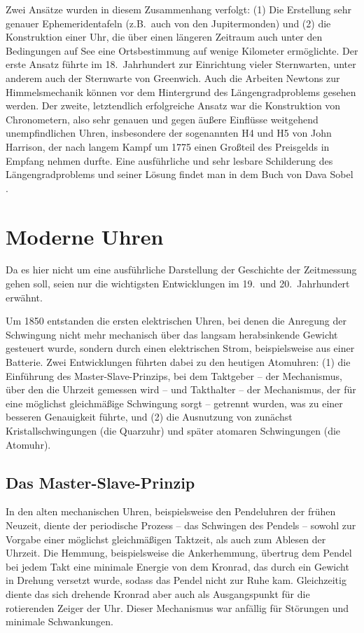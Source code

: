 Zwei Ans\"atze wurden in diesem Zusammenhang verfolgt: (1) Die Erstellung sehr genauer Ephemeridentafeln 
(z.B.\ auch von den Jupitermonden) und (2) die Konstruktion einer Uhr, die \"uber einen l\"angeren Zeitraum
auch unter den Bedingungen auf See eine Ortsbestimmung auf wenige Kilometer erm\"oglichte. Der erste
Ansatz f\"uhrte im 18.\ Jahrhundert zur Einrichtung vieler Sternwarten, unter anderem auch der
Sternwarte von Greenwich. Auch die Arbeiten Newtons zur Himmelsmechanik k\"onnen vor dem 
Hintergrund des L\"angengradproblems gesehen werden. Der zweite, letztendlich erfolgreiche Ansatz
war die Konstruktion von Chronometern, 
also sehr genauen und gegen \"au\ss ere Einfl\"usse weitgehend
unempfindlichen Uhren, insbesondere der sogenannten 
H4 und H5 von John Harrison, der nach langem Kampf
um 1775 einen Gro\ss teil des Preisgelds in Empfang nehmen durfte. Eine ausf\"uhrliche und sehr lesbare
Schilderung des L\"angengradproblems und seiner L\"osung findet man in dem Buch von Dava Sobel \cite{Sobel}.

\section{Moderne Uhren}

Da es hier nicht um eine ausf\"uhrliche Darstellung der Geschichte der Zeitmessung gehen soll, seien
nur die wichtigsten Entwicklungen im 19.\ und 20.\ Jahrhundert erw\"ahnt. 

Um 1850 entstanden die
ersten elektrischen Uhren, bei denen die Anregung der Schwingung nicht mehr mechanisch \"uber
das langsam herabsinkende Gewicht gesteuert wurde, sondern durch einen elektrischen Strom, beispielsweise
aus einer Batterie. Zwei Entwicklungen f\"uhrten dabei zu den heutigen Atomuhren: (1) die Einf\"uhrung des
\glqq Master-Slave-Prinzips\grqq, 
bei dem Taktgeber -- der Mechanismus, \"uber den die Uhrzeit gemessen 
wird -- und Takthalter -- der Mechanismus, der f\"ur eine m\"oglichst gleichm\"a\ss ige Schwingung sorgt -- 
getrennt wurden, was zu einer
besseren Genauigkeit f\"uhrte, und (2) die Ausnutzung von zun\"achst Kristallschwingungen (die Quarzuhr)
und sp\"ater atomaren Schwingungen (die Atomuhr).  

\subsection{Das Master-Slave-Prinzip}

In den alten mechanischen Uhren, beispielsweise den Pendeluhren der fr\"uhen Neuzeit, diente
der periodische Prozess -- das Schwingen des Pendels -- sowohl zur Vorgabe einer m\"oglichst gleichm\"a\ss igen
Taktzeit, als auch zum Ablesen der Uhrzeit. Die Hemmung, beispielsweise die Ankerhemmung, \"ubertrug
dem Pendel bei jedem Takt eine minimale Energie von dem Kronrad, das durch ein Gewicht in Drehung
versetzt wurde, sodass das Pendel nicht zur Ruhe kam. Gleichzeitig diente das sich drehende Kronrad aber auch 
als Ausgangspunkt f\"ur die rotierenden Zeiger der Uhr. Dieser Mechanismus war anf\"allig f\"ur St\"orungen
und minimale Schwankungen.

